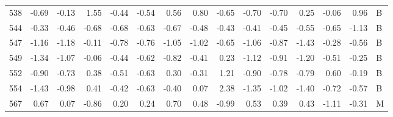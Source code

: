 \begin{table}[ht]
\begin{tabular}{rrrrrrrrrrrrrrl}
  538 & -0.69 & -0.13 & 1.55 & -0.44 & -0.54 & 0.56 & 0.80 & -0.65 & -0.70 & -0.70 & 0.25 & -0.06 & 0.96 & B \\ 
  544 & -0.33 & -0.46 & -0.68 & -0.68 & -0.63 & -0.67 & -0.48 & -0.43 & -0.41 & -0.45 & -0.55 & -0.65 & -1.13 & B \\ 
  547 & -1.16 & -1.18 & -0.11 & -0.78 & -0.76 & -1.05 & -1.02 & -0.65 & -1.06 & -0.87 & -1.43 & -0.28 & -0.56 & B \\ 
  549 & -1.34 & -1.07 & -0.06 & -0.44 & -0.62 & -0.82 & -0.41 & 0.23 & -1.12 & -0.91 & -1.20 & -0.51 & -0.25 & B \\ 
  552 & -0.90 & -0.73 & 0.38 & -0.51 & -0.63 & 0.30 & -0.31 & 1.21 & -0.90 & -0.78 & -0.79 & 0.60 & -0.19 & B \\ 
  554 & -1.43 & -0.98 & 0.41 & -0.42 & -0.63 & -0.40 & 0.07 & 2.38 & -1.35 & -1.02 & -1.40 & -0.72 & -0.57 & B \\ 
  567 & 0.67 & 0.07 & -0.86 & 0.20 & 0.24 & 0.70 & 0.48 & -0.99 & 0.53 & 0.39 & 0.43 & -1.11 & -0.31 & M \\ 
   \hline
\end{tabular}
\end{table}
